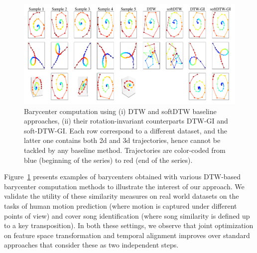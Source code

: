 \begin{figure}[t]
	\centering
	\includegraphics[width=\linewidth]{fig/barycenter_toys_allinone}
	\caption{
		Barycenter computation using (i) DTW and softDTW baseline approaches, (ii) their rotation-invariant counterparts DTW-GI and soft-DTW-GI.
		Each row correspond to a different dataset, and the latter one contains both 2d and 3d trajectories, hence cannot be tackled by any baseline method.
		Trajectories are color-coded from blue (beginning of the series) to red (end of the series).
		\label{fig:dtw_gi_bary}
	}
\end{figure}

Figure~\ref{fig:dtw_gi_bary} presents examples of barycenters obtained with
various DTW-based barycenter computation methods to illustrate the interest of
our approach.
We validate the utility of these similarity measures on real world
datasets on the tasks of human motion prediction (where motion is captured under
different points of view) and cover song identification (where song similarity
is defined up to a key transposition).
In both these settings, we observe that joint optimization on feature space
transformation and temporal alignment improves over standard approaches that
consider these as two independent steps.
